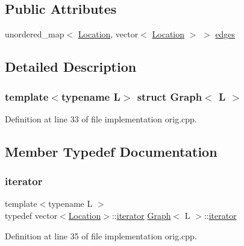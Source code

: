 \subsection*{Public Attributes}
\begin{DoxyCompactItemize}
\item 
unordered\+\_\+map$<$ \hyperlink{struct_graph_aea7d42bb67163fe692353674435a1426}{Location}, vector$<$ \hyperlink{struct_graph_aea7d42bb67163fe692353674435a1426}{Location} $>$ $>$ \hyperlink{struct_graph_a8b01818e086835dc5d24ec4082afeef0}{edges}
\end{DoxyCompactItemize}


\subsection{Detailed Description}
\subsubsection*{template$<$typename L$>$\newline
struct Graph$<$ L $>$}



Definition at line 33 of file implementation orig.\+cpp.



\subsection{Member Typedef Documentation}
\mbox{\label{struct_graph_af43d6412d7a6034eaeacde8ca1c1d984}} 
\subsubsection{\texorpdfstring{iterator}{iterator}\hspace{0.1cm}{\footnotesize\ttfamily [1/2]}}
{\footnotesize\ttfamily template$<$typename L $>$ \\
typedef vector$<$\hyperlink{struct_graph_aea7d42bb67163fe692353674435a1426}{Location}$>$\+::\hyperlink{struct_graph_af43d6412d7a6034eaeacde8ca1c1d984}{iterator} \hyperlink{struct_graph}{Graph}$<$ L $>$\+::\hyperlink{struct_graph_af43d6412d7a6034eaeacde8ca1c1d984}{iterator}}



Definition at line 35 of file implementation orig.\+cpp.

